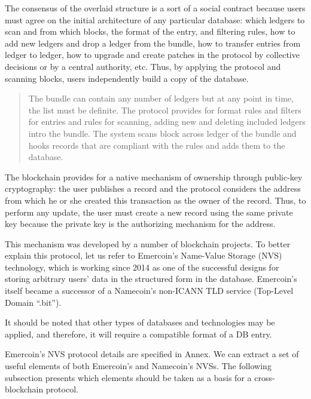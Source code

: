 \begin{multicols}{2}
The consensus of the overlaid structure is a sort of a social contract because users must agree on the initial architecture of any particular database: which ledgers to scan and from which blocks, the format of the entry, and filtering rules, how to add new ledgers and drop a ledger from the bundle, how to transfer entries from ledger to ledger, how to upgrade and create patches in the protocol by collective decisions or by a central authority, etc. Thus, by applying the protocol and scanning blocks, users independently build a copy of the database.


\begin{quote}
The bundle can contain any number of ledgers but at any point in time, the list must be definite. The protocol provides for format rules and filters for entries and rules for scanning, adding new and deleting included ledgers intro the bundle. The system scans block across ledger of the bundle and hooks records that are compliant with the rules and adds them to the database.
\end{quote}

The blockchain provides for a native mechanism of ownership through public-key cryptography: the user publishes a record and the protocol considers the address from which he or she created this transaction as the owner of the record. Thus, to perform any update, the user must create a new record using the same private key because the private key is the authorizing mechanism for the address.

This mechanism was developed by a number of blockchain projects. To better explain this protocol, let us refer to Emercoin’s Name-Value Storage (NVS) technology, which is working since 2014 as one of the successful designs for storing arbitrary users’ data in the structured form in the database. Emercoin’s itself became a successor of a Namecoin’s non-ICANN TLD service (Top-Level Domain “.bit”). 

It should be noted that other types of databases and technologies may be applied, and therefore, it will require a compatible format of a DB entry.

Emercoin’s NVS protocol details are specified in Annex. We can extract a set of useful elements of both Emercoin’s and Namecoin’s NVSs. The following subsection presents which elements should be taken as a basis for a cross-blockchain protocol.


\end{multicols}
